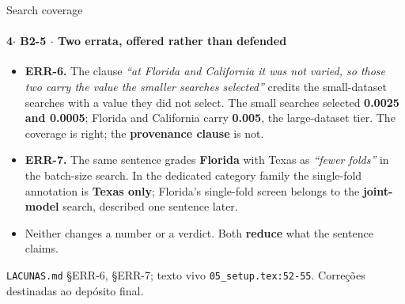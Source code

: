 \documentclass{beamer}
\begin{document}
\begin{frame}[noframenumbering]{Search coverage}
    \framesubtitle{\normalsize 4$\cdot$ \textbf{B2-5} $\cdot$ Two errata, offered rather than defended}
    \hypertarget{b25}{}
    \small
    \begin{itemize}\setlength{\itemsep}{0pt}\setlength{\parskip}{0pt}
        \item \textbf{ERR-6.} The clause \textit{``at Florida and California it was not varied, so those two carry the value the smaller searches selected''} credits the small-dataset searches with a value they did not select. The small searches selected \textbf{0.0025 and 0.0005}; Florida and California carry \textbf{0.005}, the large-dataset tier. The coverage is right; the \textbf{provenance clause} is not.
        \item \textbf{ERR-7.} The same sentence grades \textbf{Florida} with Texas as \textit{``fewer folds''} in the batch-size search. In the dedicated category family the single-fold annotation is \textbf{Texas only}; Florida's single-fold screen belongs to the \textbf{joint-model} search, described one sentence later.
        \item Neither changes a number or a verdict. Both \textbf{reduce} what the sentence claims.
    \end{itemize}
    \vfill
    {\scriptsize
    \begin{minipage}[b]{0.775\linewidth}\raggedright\textcolor{black!70}{\texttt{LACUNAS.md} §ERR-6, §ERR-7; texto vivo \texttt{05\_setup.tex:52-55}. Correções destinadas ao depósito final.}\end{minipage}\hfill
    \begin{minipage}[b]{0.20\linewidth}\raggedleft \hyperlink{b0}{}\end{minipage}}
\end{frame}
\end{document}

